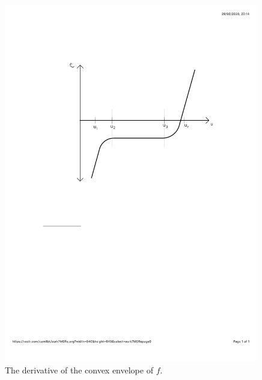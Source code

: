 \documentclass[10pt]{article}
\numberwithin{equation}{section}
\begin{document}
\begin{minipage}{\linewidth}
\begin{minipage}{0.45\linewidth}
\begin{figure}[H]
          \includegraphics[clip, trim=2cm 14cm 2cm 2cm, width=0.99\textwidth]{Figures/ConservationLaws/convex_derivative.pdf}
          \caption{The derivative of the convex envelope of $f$.}
          \label{Fig:derivativeOfEnvelope}
      \end{figure}
  \end{minipage}
\end{minipage}  
\end{document}
